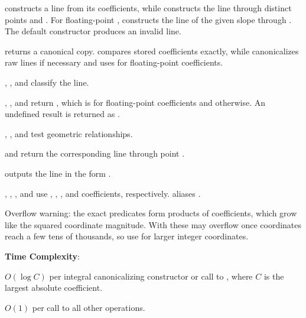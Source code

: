 \begin{compactitem}
  \item {} constructs a line from its coefficients, while  constructs the line through distinct points  and . For floating-point ,  constructs the line of the given slope through . The default constructor produces an invalid line.
  \item {} returns a canonical copy.  compares stored coefficients exactly, while  canonicalizes raw lines if necessary and uses  for floating-point coefficients.
  \item {}, , and  classify the line.
  \item {}, , and  return , which is  for floating-point coefficients and  otherwise. An undefined result is returned as .
  \item {}, , and  test geometric relationships.
  \item {} and  return the corresponding line through point .
  \item {} outputs the line in the form .
  \item {}, , , and  use , , , and  coefficients, respectively.  aliases .
\end{compactitem}

Overflow warning: the exact predicates form products of coefficients, which grow like the squared coordinate magnitude. With  these may overflow once coordinates reach a few tens of thousands, so use  for larger integer coordinates.

\textbf{Time Complexity}:
\begin{compactitem}
  \item $O(\log C)$ per integral canonicalizing constructor or call to , where $C$ is the largest absolute coefficient.
  \item $O(1)$ per call to all other operations.
\end{compactitem}

